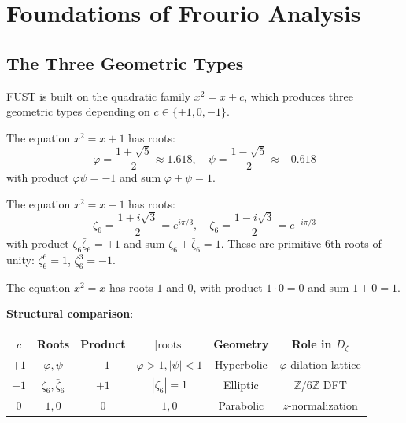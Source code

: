 \chapter{Foundations of Frourio Analysis}
\label{chap:frourio_analysis}

\section{The Three Geometric Types}
\label{sec:three_geometries}

FUST is built on the quadratic family $x^2 = x + c$, which produces three geometric types depending on $c \in \{+1, 0, -1\}$.

\begin{definition}[Hyperbolic pair: $c = +1$]
\label{def:hyperbolic}
\leanok
The equation $x^2 = x + 1$ has roots:
\[
\varphi = \frac{1+\sqrt{5}}{2} \approx 1.618, \quad \psi = \frac{1-\sqrt{5}}{2} \approx -0.618
\]
with product $\varphi\psi = -1$ and sum $\varphi + \psi = 1$.
\end{definition}

\begin{definition}[Elliptic pair: $c = -1$]
\label{def:elliptic}
\leanok
The equation $x^2 = x - 1$ has roots:
\[
\zeta_6 = \frac{1+i\sqrt{3}}{2} = e^{i\pi/3}, \quad \bar{\zeta}_6 = \frac{1-i\sqrt{3}}{2} = e^{-i\pi/3}
\]
with product $\zeta_6 \bar{\zeta}_6 = +1$ and sum $\zeta_6 + \bar{\zeta}_6 = 1$.
These are primitive 6th roots of unity: $\zeta_6^6 = 1$, $\zeta_6^3 = -1$.
\end{definition}

\begin{definition}[Parabolic pair: $c = 0$]
\label{def:parabolic}
The equation $x^2 = x$ has roots $1$ and $0$, with product $1 \cdot 0 = 0$ and sum $1 + 0 = 1$.
\end{definition}

\textbf{Structural comparison}:

\begin{center}
\begin{tabular}{|c|c|c|c|c|c|}
\hline
$c$ & Roots & Product & $|\text{roots}|$ & Geometry & Role in $D_\zeta$ \\
\hline
$+1$ & $\varphi, \psi$ & $-1$ & $\varphi > 1, |\psi| < 1$ & Hyperbolic & $\varphi$-dilation lattice \\
$-1$ & $\zeta_6, \bar{\zeta}_6$ & $+1$ & $|\zeta_6| = 1$ & Elliptic & $\mathbb{Z}/6\mathbb{Z}$ DFT \\
$0$ & $1, 0$ & $0$ & $1, 0$ & Parabolic & $z$-normalization \\
\hline
\end{tabular}
\end{center}

